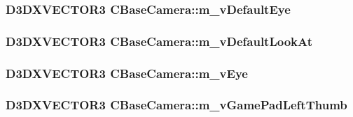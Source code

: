 \label{class_c_base_camera_a1a22483b3f168a945864e5fd156ca820}
\hypertarget{class_c_base_camera_a71147e92520e8965eac70517585ffe3c}{
\subsubsection[{m\_\-vDefaultEye}]{\setlength{\rightskip}{0pt plus 5cm}D3DXVECTOR3 {\bf CBaseCamera::m\_\-vDefaultEye}}}
\label{class_c_base_camera_a71147e92520e8965eac70517585ffe3c}
\hypertarget{class_c_base_camera_ad3dd204ec2e0c44f6757ea3ac83a4f6e}{
\subsubsection[{m\_\-vDefaultLookAt}]{\setlength{\rightskip}{0pt plus 5cm}D3DXVECTOR3 {\bf CBaseCamera::m\_\-vDefaultLookAt}}}
\label{class_c_base_camera_ad3dd204ec2e0c44f6757ea3ac83a4f6e}
\hypertarget{class_c_base_camera_aa7b7cd1276331e8ab614e04ddcde14e7}{
\subsubsection[{m\_\-vEye}]{\setlength{\rightskip}{0pt plus 5cm}D3DXVECTOR3 {\bf CBaseCamera::m\_\-vEye}}}
\label{class_c_base_camera_aa7b7cd1276331e8ab614e04ddcde14e7}
\hypertarget{class_c_base_camera_a82a20dcc1d03a97e52f9f336b0f0e33b}{
\subsubsection[{m\_\-vGamePadLeftThumb}]{\setlength{\rightskip}{0pt plus 5cm}D3DXVECTOR3 {\bf CBaseCamera::m\_\-vGamePadLeftThumb}}}
\label{class_c_base_camera_a82a20dcc1d03a97e52f9f336b0f0e33b}
